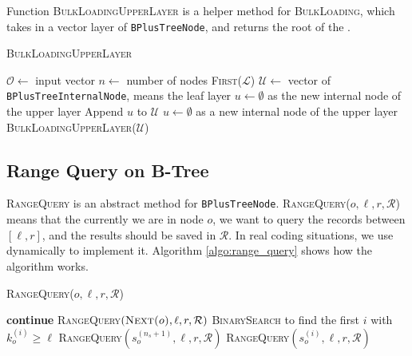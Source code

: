 Function \textsc{BulkLoadingUpperLayer} is a helper method for \textsc{BulkLoading}, which takes in a vector layer of \texttt{BPlusTreeNode}, and returns the root of the \bplustree.

\begin{algorithm}
	\caption{\textsc{BulkLoadingUpperLayer}}
	\begin{algorithmic}
        \State $\mathcal{O} \leftarrow $ input vector
        \State $n\leftarrow$ number of nodes
        \State\Return \textsc{First($\mathcal{L}$)}
        \EndIf
        \State $\mathcal{U} \leftarrow $ vector of \texttt{BPlusTreeInternalNode}, means the leaf layer
        \State $u \leftarrow\emptyset$ as the new internal node of the upper layer
            \State Append $u$ to $\mathcal{U}$
            \State $u\leftarrow\emptyset$ as a new internal node of the upper layer
        \EndIf
        \EndFor
        \State \Return \textsc{BulkLoadingUpperLayer($\mathcal{U}$)}
	\end{algorithmic}
\end{algorithm}

\subsection{Range Query on B-Tree}

\textsc{RangeQuery} is an abstract method for \texttt{BPlusTreeNode}. \textsc{RangeQuery($o, \ell, r, \mathcal{R}$)} means that the currently we are in node $o$, we want to query the records between $[\ell, r]$, and the results should be saved in $\mathcal{R}$. In real coding situations, we use dynamically to implement it. Algorithm \ref{algo:range_query} shows how the algorithm works.

\begin{algorithm}
\caption{\textsc{RangeQuery($o, \ell, r, \mathcal{R}$)}}\label{algo:range_query}
	\begin{algorithmic}
        \For{$i\in[0, n)$}
        \State \textbf{continue}
        \EndIf
        \State\Return
        \EndIf
        \EndFor
            \State\textsc{RangeQuery$\left(\textsc{Next($o$)}, \ell, r, \mathcal{R}\right)$}
        \Else
        \State \textsc{BinarySearch} to find the first $i$ with $k_o^{(i)}\ge \ell$
            \State \textsc{RangeQuery$\left(s_{o}^{\left(n_s+1\right)}, \ell, r, \mathcal{R}\right)$}
        \Else
            \State \textsc{RangeQuery$\left(s_{o}^{\left(i\right)}, \ell, r, \mathcal{R}\right)$}
        \EndIf
        \EndIf
    \end{algorithmic}
\end{algorithm}
